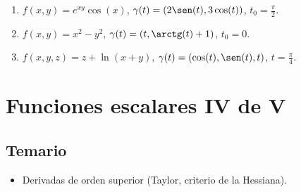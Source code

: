 \documentclass[11pt]{book}
\theoremstyle{definicion}
\theoremstyle{teorema}
\theoremstyle{ejemplo}
\begin{document}
\begin{enumerate}
\begin{enumerate}
\item $f(x,y)=e^{xy}\cos(x)$, $\gamma(t)=(2\sen(t),3\cos(t))$, $t_0=\frac{\pi}{2}$.
\item $f(x,y)=x^2-y^2$, $\gamma(t)=(t,\arctg(t)+1)$, $t_0=0$.
\item $f(x,y,z)=z+\ln(x+y)$, $\gamma(t)=(\cos(t),\sen(t), t)$, $t=\frac{\pi}{4}$. 
\end{enumerate}

%

\end{enumerate}

\chapter{Funciones escalares IV de V}

\section{Temario}

\begin{itemize}
    \item Derivadas de orden superior (Taylor, criterio de la Hessiana).
\end{itemize}

\end{document}
